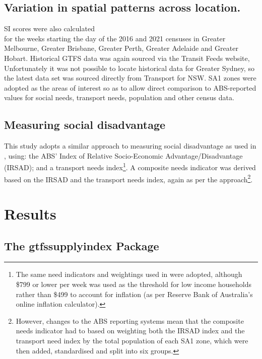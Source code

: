 \documentclass[preprint, 3p,
authoryear]{elsarticle} %
\begin{document}
\subsection{Variation in spatial patterns across
location.}\label{variation-in-spatial-patterns-across-location.}

SI scores were also calculated\\
for the weeks starting the day of the 2016 and 2021 censuses in Greater
Melbourne, Greater Brisbane, Greater Perth, Greater Adelaide and Greater
Hobart. Historical GTFS data was again sourced via the Transit Feeds
website, Unfortunately it was not possible to locate historical data for
Greater Sydney, so the latest data set was sourced directly from
Transport for NSW. SA1 zones were adopted as the areas of interest so as
to allow direct comparison to ABS-reported values for social needs,
transport needs, population and other census data.

\subsection{Measuring social
disadvantage}\label{measuring-social-disadvantage}

This study adopts a similar approach to measuring social disadvantage as
used in \citet{currie2010identifying}, using: the ABS' Index of Relative
Socio-Economic Advantage/Disadvantage (IRSAD); and a transport needs
index\footnote{The same need indicators and weightings used in
  \citet{currie2010identifying} were adopted, although \$799 or lower
  per week was used as the threshold for low income households rather
  than \$499 to account for inflation (as per Reserve Bank of
  Australia's online inflation calculator).}. A composite needs
indicator was derived based on the IRSAD and the transport needs index,
again as per the \citet{currie2010identifying} approach\footnote{\hfill\break
  However, changes to the ABS reporting systems mean that the composite
  needs indicator had to based on weighting both the IRSAD index and the
  transport need index by the total population of each SA1 zone, which
  were then added, standardised and split into six groups.}.

\section{Results}\label{results}

\subsection{The gtfssupplyindex
Package}\label{the-gtfssupplyindex-package}
\end{document}
